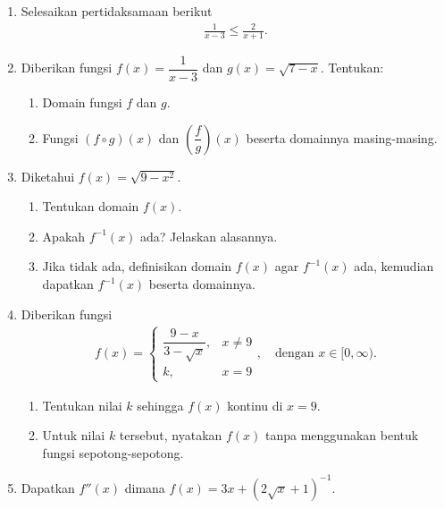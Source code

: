 \documentclass[10pt,openany,a4paper]{article}
\theoremstyle{definition}
\theoremstyle{definition}
\theoremstyle{plain}
\begin{document}
\begin{enumerate}
    \item Selesaikan pertidaksamaan berikut
    \begin{align*}
        \frac{1}{x-3}\leq\frac{2}{x+1}.
    \end{align*}

    \item Diberikan fungsi $f(x)=\dfrac{1}{x-3}$ dan $g(x)=\sqrt{7-x}$. Tentukan:
    \begin{enumerate}
        \item Domain fungsi $f$ dan $g$.
        \item Fungsi $(f\circ g)(x)$ dan $\left(\dfrac{f}{g}\right)(x)$ beserta domainnya masing-masing.
    \end{enumerate}

    \item Diketahui $f(x)=\sqrt{9-x^2}$.
    \begin{enumerate}
        \item Tentukan domain $f(x)$.
        \item Apakah $f^{-1}(x)$ ada? Jelaskan alasannya.
        \item Jika tidak ada, definisikan domain $f(x)$ agar $f^{-1}(x)$ ada, kemudian dapatkan $f^{-1}(x)$ beserta domainnya.
    \end{enumerate}

    \item Diberikan fungsi
    \begin{align*}
        f(x)=\begin{cases}
            \dfrac{9-x}{3-\sqrt{x}}, & x\neq 9\\
            k, & x=9
        \end{cases},\quad \text{dengan } x\in[0,\infty).
    \end{align*}
    \begin{enumerate}
        \item Tentukan nilai $k$ sehingga $f(x)$ kontinu di $x=9$.
        \item Untuk nilai $k$ tersebut, nyatakan $f(x)$ tanpa menggunakan bentuk fungsi sepotong-sepotong.
    \end{enumerate}

    \item Dapatkan $f''(x)$ dimana $f(x)=3x+\left(2\sqrt{x}+1\right)^{-1}$.
\end{enumerate}
\end{document}
